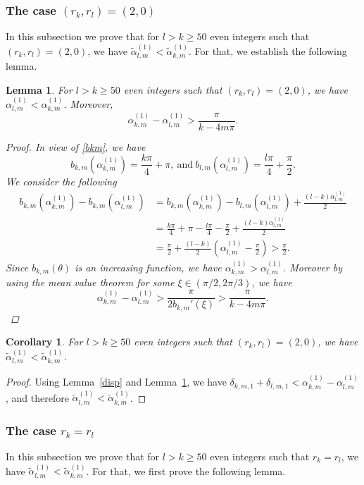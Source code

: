 \documentclass[12pt,reqno]{amsart}
\newtheorem{lem}{Lemma}
\newtheorem{cor}{Corollary}
\newcommand{\lemref}[1]{Lemma~\ref{#1}}
\begin{document}
\subsubsection{The case $(r_k,r_l)=(2,0)$} In this subsection we prove that for $l>k\ge50$ even integers such that 
$(r_k,r_l)=(2,0)$, we have $\tilde\alpha_{l,m}^{(1)}<\tilde\alpha_{k,m}^{(1)}$. For that, we establish the following lemma.
\begin{lem}\label{l(2,0)}
For $l>k\ge50$ even integers such that $(r_k,r_l)=(2,0)$, we have $\alpha_{l,m}^{(1)}<\alpha_{k,m}^{(1)}$. Moreover,
$$
\alpha_{k,m}^{(1)}-\alpha_{l,m}^{(1)}>\frac{\pi}{k-4m\pi}.
$$
\begin{proof}
In view of \eqref{bkm}, we have
$$
b_{k,m}(\alpha_{k,m}^{(1)})=\frac{k\pi}{4}+\pi,  \ \text{and} \ b_{l,m}(\alpha_{l,m}^{(1)})=\frac{l\pi}{4}+\frac{\pi}{2}.
$$
We consider the following
\begin{align*}
b_{k,m}(\alpha_{k,m}^{(1)})-b_{k,m}(\alpha_{l,m}^{(1)})&=b_{k,m}(\alpha_{k,m}^{(1)})-b_{l,m}(\alpha_{l,m}^{(1)})+\frac{(l-k)\alpha_{l,m}^{(1)}}{2}\\
&=\frac{k\pi}{4}+\pi-\frac{l\pi}{4}-\frac{\pi}{2}+\frac{(l-k)\alpha_{l,m}^{(1)}}{2}\\
&=\frac{\pi}{2}+\frac{(l-k)}{2}\left(\alpha_{l,m}^{(1)}-\frac{\pi}{2}\right)>\frac{\pi}{2}.
\end{align*}
Since $b_{k,m}(\theta)$ is an increasing function, we have $\alpha_{k,m}^{(1)}>\alpha_{l,m}^{(1)}$. 
Moreover by using the mean value theorem for some $\xi\in (\pi/2,2\pi/3)$, we have
$$
\alpha_{k,m}^{(1)}-\alpha_{l,m}^{(1)}>\frac{\pi}{2b_{k,m}'(\xi)}>\frac{\pi}{k-4m\pi}.
$$
\end{proof}
\end{lem}

\begin{cor}\label{c2,0}
For $l>k\ge50$ even integers such that $(r_k,r_l)=(2,0)$, we have $\tilde\alpha_{l,m}^{(1)}<\tilde\alpha_{k,m}^{(1)}$.
\end{cor}
\begin{proof}
Using \lemref{disp} and \lemref{l(2,0)}, we have $\delta_{k,m,1}+\delta_{l,m,1}<\alpha_{k,m}^{(1)}-\alpha_{l,m}^{(1)}$, and therefore $\tilde\alpha_{l,m}^{(1)}<\tilde\alpha_{k,m}^{(1)}$.
\end{proof}

\subsubsection{The case $r_k=r_l$} In this subsection we prove that 
for $l>k\ge 50$ even integers such that $r_k=r_l$, we have $\tilde\alpha_{l,m}^{(1)}<\tilde\alpha_{k,m}^{(1)}$.
For that, we first prove the following lemma.
\end{document}
